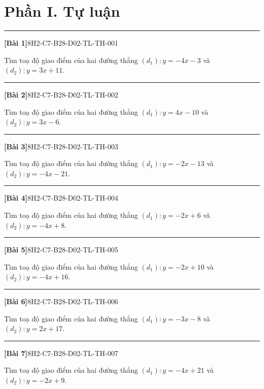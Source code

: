 \documentclass[12pt,a4paper]{article}
\newif\ifloigiai
\newenvironment{cauhoi}[2]{%
  \par\medskip\noindent\rule{\textwidth}{0.4pt}\par\nopagebreak
  \noindent\textbf{[#1]}\hfill{\scriptsize\ttfamily #2}\par\nopagebreak\smallskip}{\par}
\newcommand{\loigiai}[1]{\ifloigiai\par\smallskip\noindent\textit{Lời giải.} #1\par\fi}
\begin{document}
\section*{Phần I. Tự luận}
\begin{cauhoi}{Bài 1}{8H2-C7-B28-D02-TL-TH-001}
Tìm toạ độ giao điểm của hai đường thẳng $(d_1): y=-4x-3$ và $(d_2): y=3x+11$.
\loigiai{Hoành độ giao điểm là nghiệm của phương trình $-4x-3=3x+11$, suy ra $-7x=14$ nên $x=-2$. Thay vào $(d_1)$: $y=-4\cdot(-2)-3=5$. Vậy giao điểm là $(-2;5)$.}
\end{cauhoi}
\begin{cauhoi}{Bài 2}{8H2-C7-B28-D02-TL-TH-002}
Tìm toạ độ giao điểm của hai đường thẳng $(d_1): y=4x-10$ và $(d_2): y=3x-6$.
\loigiai{Hoành độ giao điểm là nghiệm của phương trình $4x-10=3x-6$, suy ra $x=4$ nên $x=4$. Thay vào $(d_1)$: $y=4\cdot(4)-10=6$. Vậy giao điểm là $(4;6)$.}
\end{cauhoi}
\begin{cauhoi}{Bài 3}{8H2-C7-B28-D02-TL-TH-003}
Tìm toạ độ giao điểm của hai đường thẳng $(d_1): y=-2x-13$ và $(d_2): y=-4x-21$.
\loigiai{Hoành độ giao điểm là nghiệm của phương trình $-2x-13=-4x-21$, suy ra $2x=-8$ nên $x=-4$. Thay vào $(d_1)$: $y=-2\cdot(-4)-13=-5$. Vậy giao điểm là $(-4;-5)$.}
\end{cauhoi}
\begin{cauhoi}{Bài 4}{8H2-C7-B28-D02-TL-TH-004}
Tìm toạ độ giao điểm của hai đường thẳng $(d_1): y=-2x+6$ và $(d_2): y=-4x+8$.
\loigiai{Hoành độ giao điểm là nghiệm của phương trình $-2x+6=-4x+8$, suy ra $2x=2$ nên $x=1$. Thay vào $(d_1)$: $y=-2\cdot(1)+6=4$. Vậy giao điểm là $(1;4)$.}
\end{cauhoi}
\begin{cauhoi}{Bài 5}{8H2-C7-B28-D02-TL-TH-005}
Tìm toạ độ giao điểm của hai đường thẳng $(d_1): y=-2x+10$ và $(d_2): y=-4x+16$.
\loigiai{Hoành độ giao điểm là nghiệm của phương trình $-2x+10=-4x+16$, suy ra $2x=6$ nên $x=3$. Thay vào $(d_1)$: $y=-2\cdot(3)+10=4$. Vậy giao điểm là $(3;4)$.}
\end{cauhoi}
\begin{cauhoi}{Bài 6}{8H2-C7-B28-D02-TL-TH-006}
Tìm toạ độ giao điểm của hai đường thẳng $(d_1): y=-3x-8$ và $(d_2): y=2x+17$.
\loigiai{Hoành độ giao điểm là nghiệm của phương trình $-3x-8=2x+17$, suy ra $-5x=25$ nên $x=-5$. Thay vào $(d_1)$: $y=-3\cdot(-5)-8=7$. Vậy giao điểm là $(-5;7)$.}
\end{cauhoi}
\begin{cauhoi}{Bài 7}{8H2-C7-B28-D02-TL-TH-007}
Tìm toạ độ giao điểm của hai đường thẳng $(d_1): y=-4x+21$ và $(d_2): y=-2x+9$.
\loigiai{Hoành độ giao điểm là nghiệm của phương trình $-4x+21=-2x+9$, suy ra $-2x=-12$ nên $x=6$. Thay vào $(d_1)$: $y=-4\cdot(6)+21=-3$. Vậy giao điểm là $(6;-3)$.}
\end{cauhoi}
\end{document}
